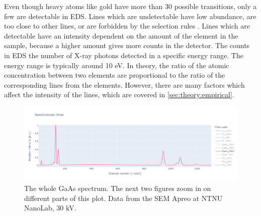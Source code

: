 Even though heavy atoms like gold have more than 30 possible transitions, only a few are detectable in EDS.
Lines which are undetectable have low abundance, are too close to other lines, or are forbidden by the selection rules \cite[Ch. 4.2.3]{goldstein_scanning_2018}.
Lines which are detectable have an intensity dependent on the amount of the element in the sample, because a higher amount gives more counts in the detector.
The counts in EDS the number of X-ray photons detected in a specific energy range.
The energy range is typically around 10 eV.
In theory, the ratio of the atomic concentration between two elements are proportional to the ratio of the corresponding lines from the elements.
However, there are many factors which affect the intensity of the lines, which are covered in \cref{sec:theory:empirical}.


\begin{figure}
    \centering
    \includegraphics[width=1\linewidth]{figures/placeholder-GaAs30kV-whole-spectrum.png}
    \caption{
        The whole GaAs spectrum.
        The next two figures zoom in on different parts of this plot.
        Data from the SEM Apreo at NTNU NanoLab, 30 kV.
    }
    \label{fig:theory:GaAs30kV-whole}
\end{figure}



